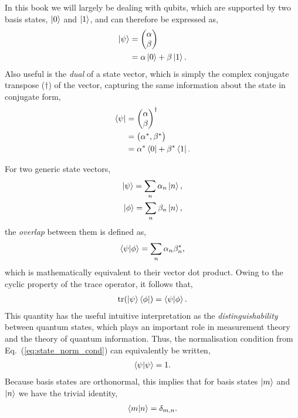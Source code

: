 \documentclass[aps,pra,twocolumn,amsmath,amssymb,nofootinbib,superscriptaddress]{revtex4}
\begin{document}
In this book we will largely be dealing with qubits, which are supported by two basis states, $\ket{0}$ and $\ket{1}$, and can therefore be expressed as,
\begin{align}
\ket\psi &= \left(\begin{matrix}{}
	\alpha \\
	\beta
\end{matrix}\right)\nonumber\\
&= \alpha\ket{0} + \beta\ket{1}.
\end{align}
Also useful is the \textit{dual} of a state vector, which is simply the complex conjugate transpose ($\dag$) of the vector, capturing the same information about the state in conjugate form,
\begin{align}
\bra\psi &= \left(\begin{matrix}{}
	\alpha \\
	\beta
\end{matrix}\right)^\dag\nonumber\\
&=\left(\begin{matrix}{}
	\alpha^*, \beta^*
\end{matrix}\right)\nonumber\\
&= \alpha^*\bra{0} + \beta^*\bra{1}.
\end{align}

For two generic state vectors,
\begin{align}
	\ket\psi = \sum_n \alpha_n \ket{n},\nonumber\\
	\ket\phi = \sum_n \beta_n \ket{n},
\end{align}
the \textit{overlap} between them is defined as,
\begin{align}
\braket{\psi|\phi} = \sum_n \alpha_n\beta_n^*,
\end{align}
which is mathematically equivalent to their vector dot product. Owing to the cyclic property of the trace operator, it follows that,
\begin{align}
\mathrm{tr}(\ket\psi\bra\phi)=\braket{\psi|\phi}.	
\end{align}
This quantity has the useful intuitive interpretation as the \textit{distinguishability} between quantum states, which plays an important role in measurement theory and the theory of quantum information. Thus, the normalisation condition from Eq.~(\ref{eq:state_norm_cond}) can equivalently be written,
\begin{align}
\braket{\psi|\psi} = 1.	
\end{align}
Because basis states are orthonormal, this implies that for basis states $\ket{m}$ and $\ket{n}$ we have the trivial identity,
\begin{align}
	\braket{m|n}=\delta_{m,n}.
\end{align}
\end{document}
